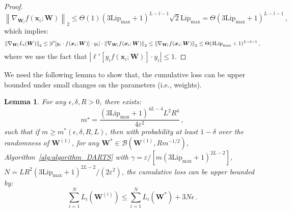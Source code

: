 \documentclass[nohyperref]{article}
\theoremstyle{plain}
\newtheorem{lemma}{Lemma}
\theoremstyle{definition}
\theoremstyle{remark}
\begin{document}
\begin{proof}
\begin{equation*}
    \left \| \nabla_{\bm{W}_l} f(\bm {x} _i;\bm W ) \right \| _2 \leq \Theta(1)(3\mathrm{Lip}_{\max}+1)^{L-l-1}\sqrt{2}\mathrm{Lip}_{\max} = \Theta(3\mathrm{Lip}_{\max}+1)^{L-l-1}\,,
\end{equation*}
which implies:
\begin{equation*}
\small
\left \| \nabla_{\bm{W}_l} L_i(\bm{W}) \right \| _2 \leq \left | {\ell}'[y_i\cdot f(\bm {x}_i;\bm{W})]\cdot y_i \right | \cdot \left \| \nabla_{\bm{W}_l} f(\bm {x}_i;\bm{W}) \right \| _2 \leq \left \| \nabla_{\bm{W}_l} f(\bm {x} _i;\bm W) \right \| _2 \leq \Theta(3\mathrm{Lip}_{\max}+1)^{L-l-1}\,,
\end{equation*}
where we use the fact that $| \ell'[ y_i f(\bm{x}_i;\bm{W})] \cdot y_i | \leq 1$.
\end{proof}

We need the following lemma to show that, the cumulative loss can be upper bounded under small changes on the parameters (i.e., weights).  
\begin{lemma}
\label{lemma:lemma_4.3_in_GuQuanquan}
    For any $\epsilon, \delta, R > 0$, there exists:
    \begin{equation*}
    m^{\star}= \frac{(3\mathrm{Lip}_{\max}+1)^{4L-4}L^2R^4}{4\varepsilon^2}\,,
    \end{equation*}
    such that if $m \geq m^* (\epsilon, \delta, R,L)$, then with probability at least $1 - \delta$ over the randomness of $\bm{W}^{(1)}$, for any $\bm{W}^* \in \mathcal{B} (\bm{W}^{(1)}, R m^{-1/2})$, Algorithm~\ref{alg:algorithm_DARTS} with $\gamma = \varepsilon/[m(3\mathrm{Lip}_{\max}+1)^{2L-2}]$, $N = LR^2(3\mathrm{Lip}_{\max}+1)^{2L-2}/(2\varepsilon^2)$, the cumulative loss can be upper bounded by:
    \begin{equation*}
        \sum_{i=1}^N L_i(\bm{W}^{(i)}) \leq \sum_{i=1}^N L_i(\bm{W}^{*}) + 3N\epsilon\,.
    \end{equation*}

\end{lemma}
\end{document}
